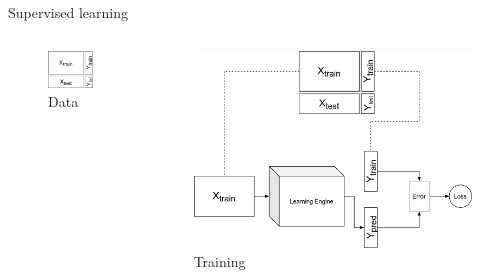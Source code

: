 \begin{frame}[allowframebreaks]{Supervised learning}
	\begin{columns}
		\begin{column}{.5\textwidth}
			\begin{figure}
				\includegraphics[width=.85\textwidth, center]{figures/ml_1_data}
				\caption*{Data}
			\end{figure}
		\end{column}
		\begin{column}{.5\textwidth}
			\begin{figure}
				\includegraphics[width=1.\textwidth, center]{figures/ml_1_train}
				\caption*{Training}
			\end{figure}
		\end{column}
	\end{columns}

\framebreak


\end{frame}

